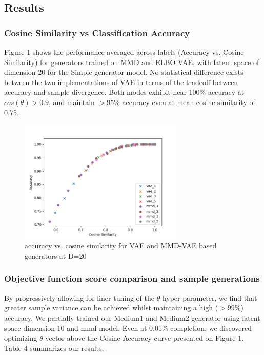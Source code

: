 \documentclass{article}
\begin{document}
\subsection {Results}
\subsubsection{Cosine Similarity vs Classification Accuracy}
Figure 1 shows the performance averaged across labels (Accuracy vs. Cosine Similarity) for generators trained on MMD and ELBO VAE, with latent space of dimension 20 for the Simple generator model. No statistical difference exists between the two implementations of VAE in terms of the tradeoff between accuracy and sample divergence. Both modes exhibit near 100\% accuracy at $cos(\theta) > 0.9$, and maintain $>95\%$ accuracy even at mean cosine similarity of 0.75. 
\begin{figure}[h]
  \centering
    \includegraphics[width=0.7\textwidth]{assets/cos_acc}
    \caption{accuracy vs. cosine similarity for VAE and MMD-VAE based generators at D=20}
\end{figure}

\subsubsection{Objective function score comparison and sample generations}

By progressively allowing for finer tuning of the $\theta$ hyper-parameter, we find that greater sample variance can be achieved whilst maintaining a high ($>99\%$) accuracy. We partially trained our Medium1 and Medium2 generator using latent space dimension 10 and mmd model. Even at 0.01\% completion, we discovered optimizing $\theta$ vector above the Cosine-Accuracy curve presented on Figure 1. Table 4 summarizes our results. \par
\end{document}
